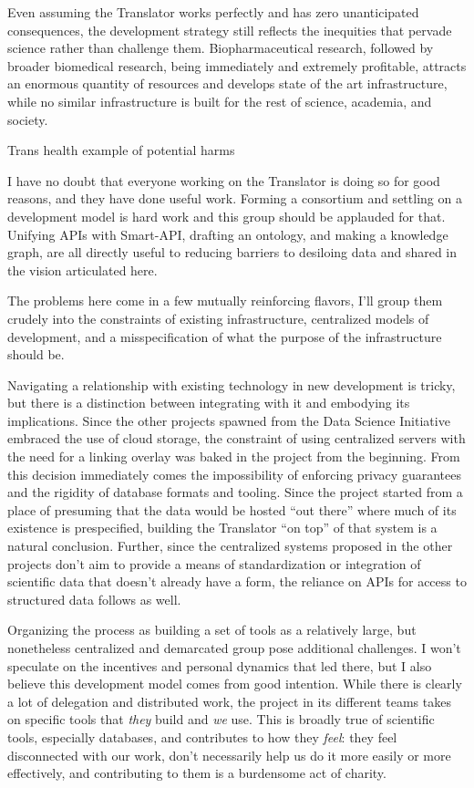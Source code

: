\documentclass[10pt]{tufte-book}
\begin{document}
Even assuming the Translator works perfectly and has zero unanticipated
consequences, the development strategy still reflects the inequities
that pervade science rather than challenge them. Biopharmaceutical
research, followed by broader biomedical research, being immediately and
extremely profitable, attracts an enormous quantity of resources and
develops state of the art infrastructure, while no similar
infrastructure is built for the rest of science, academia, and society.

Trans health {example of potential harms}

I have no doubt that everyone working on the Translator is doing so for
good reasons, and they have done useful work. Forming a consortium and
settling on a development model is hard work and this group should be
applauded for that. Unifying APIs with Smart-API, drafting an ontology,
and making a knowledge graph, are all directly useful to reducing
barriers to desiloing data and shared in the vision articulated here.

The problems here come in a few mutually reinforcing flavors, I'll group
them crudely into the constraints of existing infrastructure,
centralized models of development, and a misspecification of what the
purpose of the infrastructure should be.

Navigating a relationship with existing technology in new development is
tricky, but there is a distinction between integrating with it and
embodying its implications. Since the other projects spawned from the
Data Science Initiative embraced the use of cloud storage, the
constraint of using centralized servers with the need for a linking
overlay was baked in the project from the beginning. From this decision
immediately comes the impossibility of enforcing privacy guarantees and
the rigidity of database formats and tooling. Since the project started
from a place of presuming that the data would be hosted ``out there''
where much of its existence is prespecified, building the Translator
``on top'' of that system is a natural conclusion. Further, since the
centralized systems proposed in the other projects don't aim to provide
a means of standardization or integration of scientific data that
doesn't already have a form, the reliance on APIs for access to
structured data follows as well.

Organizing the process as building a set of tools as a relatively large,
but nonetheless centralized and demarcated group pose additional
challenges. I won't speculate on the incentives and personal dynamics
that led there, but I also believe this development model comes from
good intention. While there is clearly a lot of delegation and
distributed work, the project in its different teams takes on specific
tools that \emph{they} build and \emph{we} use. This is broadly true of
scientific tools, especially databases, and contributes to how they
\emph{feel}: they feel disconnected with our work, don't necessarily
help us do it more easily or more effectively, and contributing to them
is a burdensome act of charity.
\end{document}
